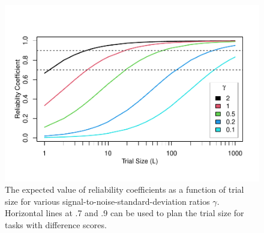 \documentclass[
  ,man]{apa6}
\begin{document}
\begin{figure}
\centering
\includegraphics{p_files/figure-latex/rel-1.pdf}
\caption{\label{fig:rel}The expected value of reliability coefficients as a function of trial size for various signal-to-noise-standard-deviation ratios \(\gamma\). Horizontal lines at .7 and .9 can be used to plan the trial size for tasks with difference scores.}
\end{figure}
\end{document}
